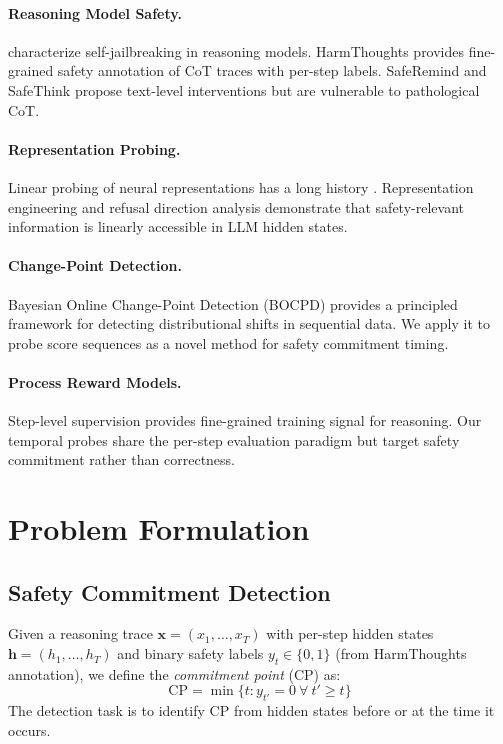 \documentclass[11pt,a4paper]{article}
\begin{document}
\paragraph{Reasoning Model Safety.} \cite{guan2025selfJailbreak} characterize self-jailbreaking in reasoning models. HarmThoughts \cite{wen2025harmthoughts} provides fine-grained safety annotation of CoT traces with per-step labels. SafeRemind and SafeThink \cite{wu2025safethink} propose text-level interventions but are vulnerable to pathological CoT.

\paragraph{Representation Probing.} Linear probing of neural representations has a long history \cite{hewitt2019structural}. Representation engineering \cite{zou2023representation} and refusal direction analysis \cite{arditi2024refusal} demonstrate that safety-relevant information is linearly accessible in LLM hidden states.

\paragraph{Change-Point Detection.} Bayesian Online Change-Point Detection (BOCPD) \cite{adams2007bayesian} provides a principled framework for detecting distributional shifts in sequential data. We apply it to probe score sequences as a novel method for safety commitment timing.

\paragraph{Process Reward Models.} Step-level supervision \cite{lightman2023lets} provides fine-grained training signal for reasoning. Our temporal probes share the per-step evaluation paradigm but target safety commitment rather than correctness.

\section{Problem Formulation}

\subsection{Safety Commitment Detection}

Given a reasoning trace $\mathbf{x} = (x_1, \ldots, x_T)$ with per-step hidden states $\mathbf{h} = (h_1, \ldots, h_T)$ and binary safety labels $y_t \in \{0, 1\}$ (from HarmThoughts annotation), we define the \emph{commitment point} (CP) as:
\begin{equation}
\text{CP} = \min\{t : y_{t'} = 0\ \forall\ t' \geq t\}
\end{equation}
The detection task is to identify CP from hidden states before or at the time it occurs.
\end{document}
